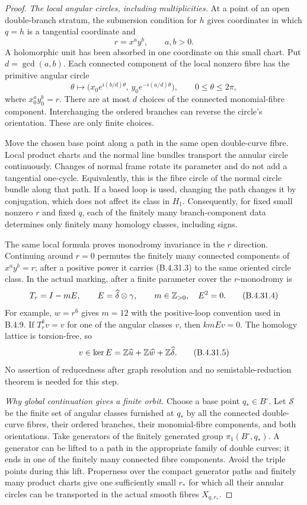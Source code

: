 \begin{proof}
\emph{The local angular circles, including multiplicities.}
At a point of an open double-branch stratum, the submersion
condition for $h$ gives coordinates in which $q=h$ is a
tangential coordinate and
\[
                 r=x^a y^b,\qquad a,b>0.
 \tag{B.4.31.2}
\]
A holomorphic unit has been absorbed in one coordinate on this
small chart. Put $d=\gcd(a,b)$. Each connected component of the
local nonzero fibre has the primitive angular circle
\[
 \theta\longmapsto
 \bigl(x_0e^{i(b/d)\theta},\,
       y_0e^{-i(a/d)\theta}\bigr),
       \qquad 0\le\theta\le2\pi,
 \tag{B.4.31.3}
\]
where $x_0^a y_0^b=r$. There are at most $d$ choices of the
connected monomial-fibre component. Interchanging the ordered
branches can reverse the circle's orientation. These are only
finite choices.

Move the chosen base point along a path in the same open
double-curve fibre. Local product charts and the normal line
bundles transport the annular circle continuously. Changes of
normal frame rotate its parameter and do not add a tangential
one-cycle. Equivalently, this is the fibre circle of the normal
circle bundle along that path. If a based loop is used, changing
the path changes it by conjugation, which does not affect its
class in $H_1$. Consequently, for fixed small nonzero $r$ and
fixed $q$, each of the finitely many branch-component data
determines only finitely many homology classes, including signs.

The same local formula proves monodromy invariance in the
$r$ direction. Continuing around $r=0$ permutes the finitely
many connected components of $x^a y^b=r$; after a positive
power it carries (B.4.31.3) to the same oriented circle class.
In the actual marking, after a finite parameter cover the
$r$-monodromy is
\[
 T_r=I-mE,\qquad
 E=\widehat\delta\otimes\gamma,\qquad m\in\mathbb Z_{>0},
 \quad E^2=0.
 \tag{B.4.31.4}
\]
For example, $w=r^6$ gives $m=12$ with the positive-loop
convention used in B.4.9. If $T_r^k v=v$ for one of the
angular classes $v$, then $kmEv=0$. The homology lattice is
torsion-free, so
\[
 v\in\ker E
    =\mathbb Z\widehat u+\mathbb Z\widehat w+\mathbb Z\widehat\delta.
 \tag{B.4.31.5}
\]
No assertion of reducedness after graph resolution and no
semistable-reduction theorem is needed for this step.

\emph{Why global continuation gives a finite orbit.}
Choose a base point $q_*\in B^\circ$. Let $\mathscr S$ be the
finite set of angular classes furnished at $q_*$ by all the
connected double-curve fibres, their ordered branches, their
monomial-fibre components, and both orientations.
Take generators of the finitely generated group
$\pi_1(B^\circ,q_*)$. A generator can be lifted to a path in
the appropriate family of double curves; it ends in one of
the finitely many connected fibre components. Avoid the
triple points during this lift. Properness over the compact
generator paths and finitely many product charts give one
sufficiently small $r_*$ for which all their annular circles
can be transported in the actual smooth fibres
$X_{q,r_*}$.


\end{proof}
